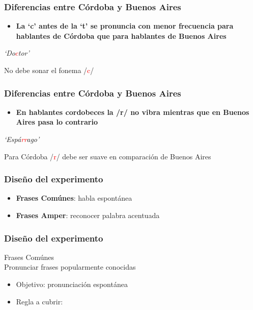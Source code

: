 \documentclass[mathserif, blue]{beamer}%
\begin{document}
\begin{frame}
 	\frametitle{Diferencias entre Córdoba y Buenos Aires}
 	\begin{itemize}\itemsep=3ex
 		\item \textbf{La `c' antes de la `t' se pronuncia con menor frecuencia para hablantes de Córdoba que para hablantes de Buenos Aires} \\ 
 	\end{itemize}
 	
 	\begin{center}
 		\textit{`Do\textcolor{red}{c}tor'}
 	\end{center} 
 	
 	\begin{center}
 		No debe sonar el fonema /\textcolor{red}{c}/
 	\end{center}
\end{frame}
 
\begin{frame}
	\frametitle{Diferencias entre Córdoba y Buenos Aires}
	\begin{itemize}\itemsep=3ex
		\item \textbf{En hablantes cordobeces la /r/ no vibra mientras que en Buenos Aires pasa lo contrario} \\ 
	\end{itemize}	
	
	\begin{center}
		\textit{`Espá\textcolor{red}{rr}ago'}
	\end{center} 
	
	\begin{center}
		Para Córdoba /\textcolor{red}{r}/ debe ser suave en comparación de Buenos Aires
	\end{center}
\end{frame} 

\begin{frame}
	\frametitle{Diseño del experimento}
	\begin{itemize}\itemsep=10ex
		\item \textbf{Frases Comúnes}: habla espontánea
		\item \textbf{Frases Amper}: reconocer palabra acentuada
	\end{itemize}	
\end{frame} 

\begin{frame}
	\frametitle{Diseño del experimento}
	{\Large Frases Comúnes} \\
	Pronunciar frases popularmente conocidas
	
	\begin{itemize}
		\item Objetivo: pronunciación espontánea
		\item Regla a cubrir: 
	\end{itemize}
\end{frame} 
\end{document}
